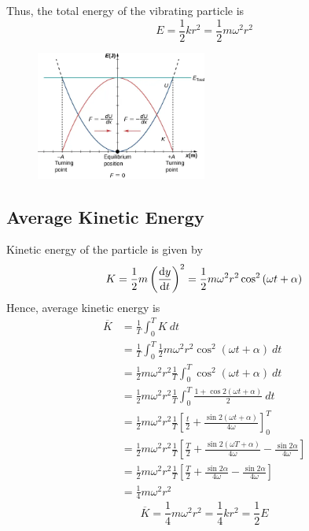\documentclass[12pt]{article}
\numberwithin{equation}{subsection}
\begin{document}
Thus, the total energy of the vibrating particle is
\begin{equation}
    \boxed{ E = \frac{1}{2} k r^2 = \frac{1}{2} m \omega^2 r^2 }
\end{equation}

\begin{figure}[htpb]
    \centering
    \includegraphics[width=0.5\textwidth]{2.png}
\end{figure}

\subsection{Average Kinetic Energy}
Kinetic energy of the particle is given by
\begin{equation}
    K = \frac{1}{2} m \left( \dv{y}{t} \right)^2 = \frac{1}{2} m \omega^2 r^2 \cos^2{(\omega t + \alpha)}
\end{equation}
Hence, average kinetic energy is
\begin{align*}
    \overline{K} &= \frac{1}{T} \int_{0}^{T} K \: dt \\
    &= \frac{1}{T} \int_{0}^{T} \frac{1}{2} m \omega^2 r^2 \cos^2{(\omega t + \alpha)} \: dt \\
    &= \frac{1}{2} m \omega^2 r^2 \frac{1}{T} \int_{0}^{T} \cos^2{(\omega t + \alpha)} \: dt \\
    &= \frac{1}{2} m \omega^2 r^2 \frac{1}{T} \int_{0}^{T} \frac{1 + \cos{2(\omega t + \alpha)}}{2} \: dt \\
    &= \frac{1}{2} m \omega^2 r^2 \frac{1}{T} \left[ \frac{t}{2} + \frac{\sin{2(\omega t + \alpha)}}{4\omega} \right]_{0}^{T} \\
    &= \frac{1}{2} m \omega^2 r^2 \frac{1}{T} \left[ \frac{T}{2} + \frac{\sin{2(\omega T + \alpha)}}{4\omega} - \frac{\sin{2\alpha}}{4\omega} \right] \\
    &= \frac{1}{2} m \omega^2 r^2 \frac{1}{T} \left[ \frac{T}{2} + \frac{\sin{2\alpha}}{4\omega} - \frac{\sin{2\alpha}}{4\omega} \right] \\
    &= \frac{1}{4} m \omega^2 r^2
\end{align*}
\begin{equation}
    \boxed{ \overline{K} = \frac{1}{4} m \omega^2 r^2 = \frac{1}{4}k r^2 = \frac{1}{2} E }
\end{equation}
\end{document}
